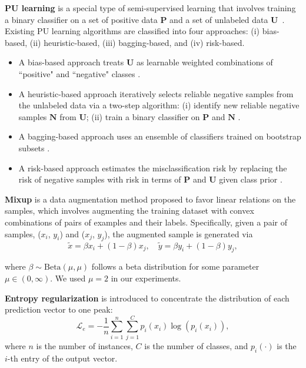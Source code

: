 \documentclass[conference]{IEEEtran}
\begin{document}
\textbf{PU learning} is a special type of semi-supervised learning that involves training a binary classifier on a set of positive data $\mathbf{P}$ and a set of unlabeled data $\mathbf{U}$~\cite{li2005learning}. 
Existing PU learning algorithms are classified into four approaches: (i) bias-based, (ii) heuristic-based, (iii) bagging-based, and (iv) risk-based. 

\begin{itemize}
\item A bias-based approach treats $\mathbf{U}$ as learnable weighted combinations of ``positive" and ``negative" classes \cite{elkan2008learning}.

\item A heuristic-based approach iteratively selects reliable negative samples from the unlabeled data via a two-step algorithm: (i) identify new reliable negative samples $\mathbf{N}$ from $\mathbf{U}$; (ii) train a binary classifier on $\mathbf{P}$ and $\mathbf{N}$ \cite{liu2002partially}.

\item A bagging-based approach uses an ensemble of classifiers trained on bootstrap subsets \cite{mordelet2014bagging}.

\item A risk-based approach estimates the misclassification risk by replacing the risk of negative samples with risk in terms of $\mathbf{P}$ and $\mathbf{U}$ given class prior \cite{du2014analysis}.
\end{itemize}

\textbf{Mixup} \cite{zhang2017mixup} is a data augmentation method proposed to favor linear relations on the samples, which involves augmenting the training dataset with convex combinations of pairs of examples and their labels. Specifically, given a pair of samples, ($x_i$, $y_i$) and ($x_j$, $y_j$), the augmented sample is generated via
\vspace*{-0.1em}
\begin{equation*}
\tilde{x}=\beta x_i + (1-\beta)x_j, \quad
\tilde{y}=\beta y_i + (1-\beta)y_j,
\end{equation*}
\vspace*{-1.1em}

\noindent where $\beta \sim \text{Beta}(\mu, \mu)$ follows a beta distribution for some parameter $\mu \in (0, \infty)$. We used $\mu=2$ in our experiments.

\textbf{Entropy regularization} \cite{tanaka2018joint} is introduced to concentrate the distribution of each prediction vector to one peak:
\begin{equation}
    \mathcal{L}_e=-\frac{1}{n}\sum_{i=1}^n\sum_{j=1}^C p_i(x_i)\log(p_i(x_i)),
\end{equation}
where $n$ is the number of instances, $C$ is the number of classes, and $p_i(\cdot)$ is the $i$-th entry of the output vector.
\end{document}

